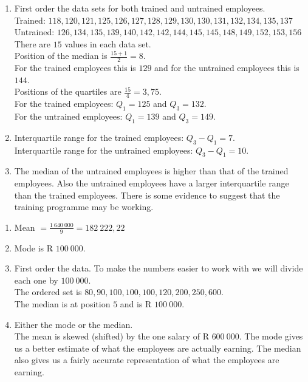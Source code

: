 \begin{eocsolutions}{}
{}
\item %
\begin{enumerate}[noitemsep, label=\textbf{(\alph*)} ]
\item
First order the data sets for both trained and untrained employees.\\
Trained: $118, 120, 121, 125, 126, 127, 128, 129, 130, 130, 131, 132, 134, 135, 137$ \\
Untrained: $126, 134, 135, 139, 140, 142, 142, 144, 145, 145, 148, 149, 152, 153, 156$ \\
There are $15$ values in each data set. \\
Position of the median is $\frac{15+1}{2}=8$. \\
For the trained employees this is $129$ and for the untrained employees this is $144$.\\
Positions of the quartiles are $\frac{15}{4}=3,75$.\\
For the trained employees: $Q_1=125$ and $Q_3=132$.\\
For the untrained employees: $Q_1=139$ and $Q_3=149$.\\
\item
Interquartile range for the trained employees: $Q_3-Q_1=7$.\\
Interquartile range for the untrained employees: $Q_3-Q_1=10$.\\
\item
The median of the untrained employees is higher than that of the trained employees. Also the untrained employees have a larger interquartile range than the trained employees. There is some evidence to suggest that the training programme may be working.
\end{enumerate}
\item %
\begin{enumerate}[noitemsep, label=\textbf{(\alph*)} ]
\item
Mean $=\frac{1~640~000}{9}=182~222,22$
\item
Mode is R $100~000$.
\item
 First order the data. To make the numbers easier to work with we will divide each one by $100~000$.\\
 The ordered set is $80, 90, 100, 100, 100, 120, 200, 250, 600$.  \\
The median is at position $5$ and is R $100~000$.
\item
Either the mode or the median. \\
The mean is skewed (shifted) by the one salary of R $600~000$. The mode gives us a better estimate of what the employees are actually earning. The median also gives us a fairly accurate representation of what the employees are earning.



\end{enumerate}
\end{eocsolutions}
